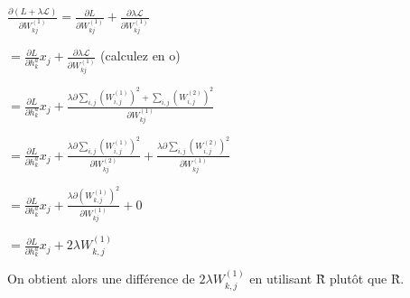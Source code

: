 \documentclass[a4paper,10pt]{article}
\begin{document}
$\frac{\partial (L+\lambda \mathcal{L})}{\partial W_{kj}^{(1)}} = \frac{\partial L}{\partial W_{kj}^{(1)}}+\frac{\partial \lambda \mathcal{L}}{\partial W_{kj}^{(1)}}$

$ = \frac{\partial L}{\partial h^{a}_{k}} x_j+ \frac{\partial \lambda \mathcal{L}}{\partial W_{kj}^{(1)}} $ (calculez en o)

$ = \frac{\partial L}{\partial h^{a}_{k}} x_j+ \frac{\lambda \partial \sum_{i,j} (W_{i,j}^{(1)})^2 + \sum_{i,j} (W_{i,j}^{(2)})^2}{\partial W_{kj}^{(1)}} $ 

$ = \frac{\partial L}{\partial h^{a}_{k}} x_j+\frac{\lambda \partial \sum_{i,j} (W_{i,j}^{(1)})^2}{\partial W_{kj}^{(2)}}+\frac{\lambda \partial \sum_{i,j} (W_{i,j}^{(2)})^2}{\partial W_{kj}^{(1)}}  $ 

$ = \frac{\partial L}{\partial h^{a}_{k}} x_j+\frac{\lambda \partial (W_{k,j}^{(1)})^2}{\partial W_{kj}^{(1)}}+0  $ 

$ = \frac{\partial L}{\partial h^{a}_{k}} x_j+ 2 \lambda W_{k,j}^{(1)} $ 

On obtient alors une différence de $2 \lambda W_{k,j}^{(1)}$ en utilisant \~{R} plutôt que \^{R}.
\end{document}
